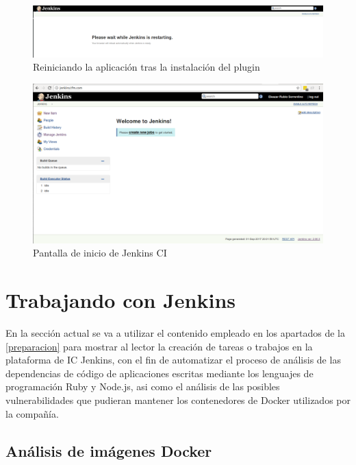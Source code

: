\begin{figure}[htbp]
	\centering
	\includegraphics[width=1.0\linewidth]
	{desarrollo/figuras/jenkins_09.png}
	\caption{Reiniciando la aplicación tras la instalación del plugin}
	\label{jenkins_09}
\end{figure}

\begin{figure}[htbp]
	\centering
	\includegraphics[width=1.0\linewidth]
	{desarrollo/figuras/jenkins_10.png}
	\caption{Pantalla de inicio de Jenkins \gls{CI}}
	\label{jenkins_10}
\end{figure}

\section{Trabajando con Jenkins}\label{trabajando_jenkins}

En la sección actual se va a utilizar el contenido empleado en los apartados de la \autoref{preparacion} para mostrar al lector la creación de tareas o trabajos en la plataforma de \gls{IC} Jenkins, con el fin de automatizar el proceso de análisis de las dependencias de código de aplicaciones escritas mediante los lenguajes de programación Ruby y Node.js, asi como el análisis de las posibles vulnerabilidades que pudieran mantener los contenedores de Docker utilizados por la compañía.

\subsection{Análisis de imágenes Docker}


